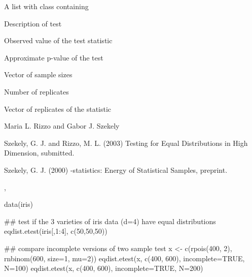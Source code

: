 \documentclass{article}
\begin{document}
\begin{Value}
A list with class  containing
\begin{ldescription}
\item[\code{method}] Description of test
\item[\code{statistic}] Observed value of the test statistic
\item[\code{p.value}] Approximate p-value of the test
\item[\code{sizes}] Vector of sample sizes
\item[\code{R}] Number of replicates
\item[\code{replicates}] Vector of replicates of the statistic
\end{ldescription}
\end{Value}
\begin{Author}\relax
Maria L. Rizzo  and
Gabor J. Szekely 
\end{Author}
\begin{References}\relax
Szekely, G. J. and Rizzo, M. L. (2003) Testing for Equal
Distributions in High Dimension, submitted.

Szekely, G. J. (2000) -statistics: Energy of 
Statistical Samples, preprint.\end{References}
\begin{SeeAlso}\relax
{},
\end{SeeAlso}
\begin{Examples}
\begin{ExampleCode}
 data(iris)
 
 ## test if the 3 varieties of iris data (d=4) have equal distributions
 eqdist.etest(iris[,1:4], c(50,50,50))

 ## compare incomplete versions of two sample test
 x <- c(rpois(400, 2), rnbinom(600, size=1, mu=2))
 eqdist.etest(x, c(400, 600), incomplete=TRUE, N=100)
 eqdist.etest(x, c(400, 600), incomplete=TRUE, N=200)
  

\end{ExampleCode}
\end{Examples}
\end{document}
